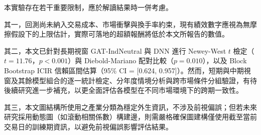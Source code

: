 本實驗存在若干重要限制，應於解讀結果時一併考慮。

其一，回測尚未納入交易成本、市場衝擊與換手率約束，現有績效數字應視為無摩擦假設下的上限估計，實際可落地的超額報酬將低於本文所報告的數值。

其二，本文已針對長期視窗 GAT-IndNeutral 與 DNN 進行 Newey-West $t$ 檢定（$t = 11.76$，$p < 0.001$）與 Diebold-Mariano 配對比較（$p = 0.010$），以及 Block Bootstrap ICIR 信賴區間估算（95\% CI = [0.624, 0.957]）。然而，短期與中期視窗及其餘模型組合的逐一統計檢定、分年度情境分析與跨市場條件分組驗證，有待後續研究進一步補充，以更全面評估各模型在不同市場環境下的跨期一致性。

其三，本文圖結構所使用之產業分類為穩定外生資訊，不涉及前視偏誤；但若未來研究採用動態圖（如滾動相關係數）構建邊，則需嚴格確保圖建構僅使用截至當前交易日的訓練期資訊，以避免前視偏誤影響評估結果。

\FloatBarrier
